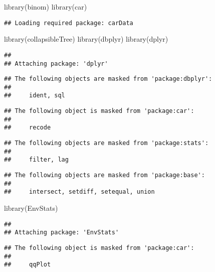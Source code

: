 \documentclass[
]{article}
\author{}
\date{\vspace{-2.5em}}
\newenvironment{Shaded}{\begin{snugshade}}{\end{snugshade}}
\newcommand{\FunctionTok}[1]{\textcolor[rgb]{0.00,0.00,0.00}{#1}}
\newcommand{\NormalTok}[1]{#1}
\begin{document}
\begin{Shaded}
\begin{Highlighting}[]
\FunctionTok{library}\NormalTok{(binom)}
\FunctionTok{library}\NormalTok{(car)}
\end{Highlighting}
\end{Shaded}

\begin{verbatim}
## Loading required package: carData
\end{verbatim}

\begin{Shaded}
\begin{Highlighting}[]
\FunctionTok{library}\NormalTok{(collapsibleTree)}
\FunctionTok{library}\NormalTok{(dbplyr)}
\FunctionTok{library}\NormalTok{(dplyr)}
\end{Highlighting}
\end{Shaded}

\begin{verbatim}
## 
## Attaching package: 'dplyr'
\end{verbatim}

\begin{verbatim}
## The following objects are masked from 'package:dbplyr':
## 
##     ident, sql
\end{verbatim}

\begin{verbatim}
## The following object is masked from 'package:car':
## 
##     recode
\end{verbatim}

\begin{verbatim}
## The following objects are masked from 'package:stats':
## 
##     filter, lag
\end{verbatim}

\begin{verbatim}
## The following objects are masked from 'package:base':
## 
##     intersect, setdiff, setequal, union
\end{verbatim}

\begin{Shaded}
\begin{Highlighting}[]
\FunctionTok{library}\NormalTok{(EnvStats)}
\end{Highlighting}
\end{Shaded}

\begin{verbatim}
## 
## Attaching package: 'EnvStats'
\end{verbatim}

\begin{verbatim}
## The following object is masked from 'package:car':
## 
##     qqPlot
\end{verbatim}
\end{document}
